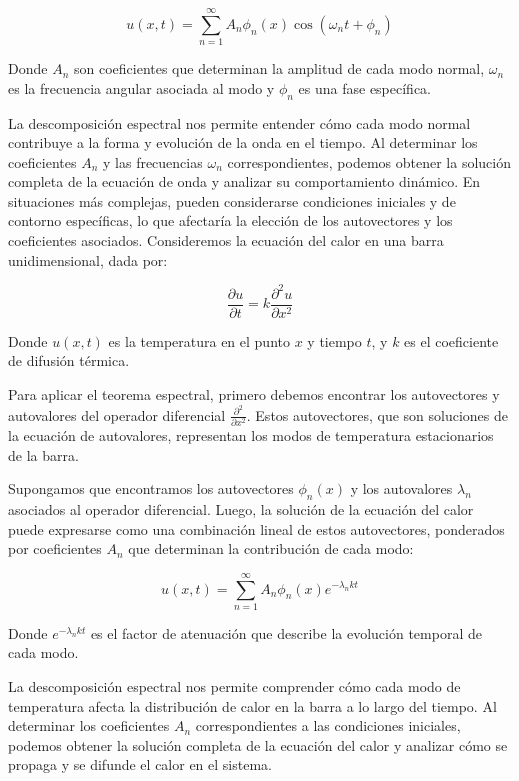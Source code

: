 \documentclass{article}
\begin{document}
    \begin{equation}
    u(x, t) = \sum_{n=1}^{\infty} A_n \phi_n(x) \cos(\omega_n t + \phi_n)
    \end{equation}
    
    Donde \(A_n\) son coeficientes que determinan la amplitud de cada modo normal, \(\omega_n\) es la frecuencia angular asociada al modo y \(\phi_n\) es una fase específica.
    
    La descomposición espectral nos permite entender cómo cada modo normal contribuye a la forma y evolución de la onda en el tiempo. Al determinar los coeficientes \(A_n\) y las frecuencias \(\omega_n\) correspondientes, podemos obtener la solución completa de la ecuación de onda y analizar su comportamiento dinámico. En situaciones más complejas, pueden considerarse condiciones iniciales y de contorno específicas, lo que afectaría la elección de los autovectores y los coeficientes asociados.
    Consideremos la ecuación del calor en una barra unidimensional, dada por:

    \begin{equation}
    \frac{{\partial u}}{{\partial t}} = k \frac{{\partial^2 u}}{{\partial x^2}}
    \end{equation}

    Donde \(u(x, t)\) es la temperatura en el punto \(x\) y tiempo \(t\), y \(k\) es el coeficiente de difusión térmica.

    Para aplicar el teorema espectral, primero debemos encontrar los autovectores y autovalores del operador diferencial \(\frac{{\partial^2}}{{\partial x^2}}\). Estos autovectores, que son soluciones de la ecuación de autovalores, representan los modos de temperatura estacionarios de la barra.

    Supongamos que encontramos los autovectores \(\phi_n(x)\) y los autovalores \(\lambda_n\) asociados al operador diferencial. Luego, la solución de la ecuación del calor puede expresarse como una combinación lineal de estos autovectores, ponderados por coeficientes \(A_n\) que determinan la contribución de cada modo:

    \begin{equation}
    u(x, t) = \sum_{n=1}^{\infty} A_n \phi_n(x) e^{-\lambda_n k t}
    \end{equation}

    Donde \(e^{-\lambda_n k t}\) es el factor de atenuación que describe la evolución temporal de cada modo.

    La descomposición espectral nos permite comprender cómo cada modo de temperatura afecta la distribución de calor en la barra a lo largo del tiempo. Al determinar los coeficientes \(A_n\) correspondientes a las condiciones iniciales, podemos obtener la solución completa de la ecuación del calor y analizar cómo se propaga y se difunde el calor en el sistema.
\end{document}
